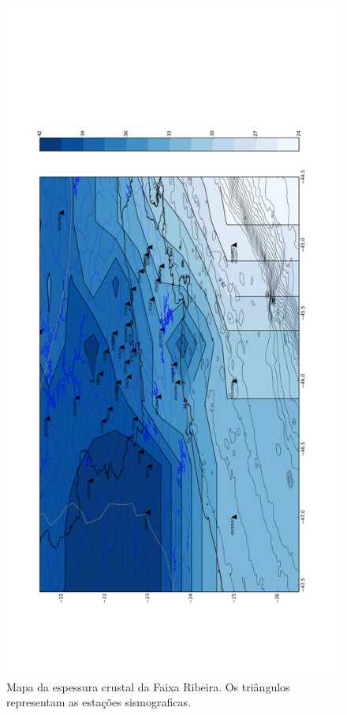 \begin{figure}[!ht]
\centering
\includegraphics[scale=0.20]{Figs/Interpolacao_Linear.png}
\caption{Mapa da espessura crustal da Faixa Ribeira. Os triângulos representam as estações sismograficas.}
\label{Interpolacao}
\end{figure}

